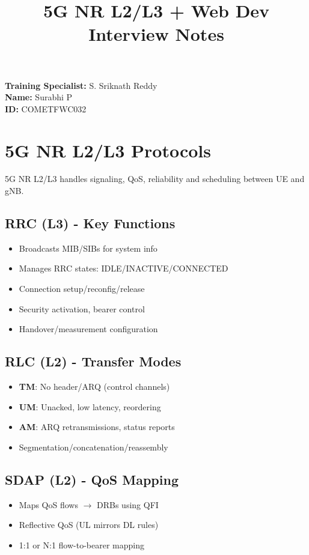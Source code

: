 \documentclass[12pt,a4paper]{article}
\title{\textbf{5G NR L2/L3 + Web Dev Interview Notes}}
\author{}
\date{}
\begin{document}
\maketitle

\begin{flushright}
\textbf{Training Specialist:} S. Sriknath Reddy\\
\textbf{Name:} Surabhi P\\
\textbf{ID:} COMETFWC032
\end{flushright}

\onehalfspacing

\section{5G NR L2/L3 Protocols}

5G NR L2/L3 handles signaling, QoS, reliability and scheduling between UE and gNB.

\subsection{RRC (L3) - Key Functions}
\begin{itemize}
  \item Broadcasts MIB/SIBs for system info
  \item Manages RRC states: IDLE/INACTIVE/CONNECTED
  \item Connection setup/reconfig/release
  \item Security activation, bearer control
  \item Handover/measurement configuration
\end{itemize}

\subsection{RLC (L2) - Transfer Modes}
\begin{itemize}
  \item \textbf{TM}: No header/ARQ (control channels)
  \item \textbf{UM}: Unacked, low latency, reordering
  \item \textbf{AM}: ARQ retransmissions, status reports
  \item Segmentation/concatenation/reassembly
\end{itemize}

\subsection{SDAP (L2) - QoS Mapping}
\begin{itemize}
  \item Maps QoS flows $\rightarrow$ DRBs using QFI
  \item Reflective QoS (UL mirrors DL rules)
  \item 1:1 or N:1 flow-to-bearer mapping
\end{itemize}
\end{document}
